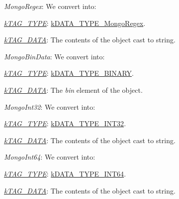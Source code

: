 \begin{DoxyItemize}
\begin{DoxyItemize}
\begin{DoxyItemize}
\end{DoxyItemize}
\end{DoxyItemize}
\item {\itshape Mongo\-Regex\/}\-: We convert into\-: 
\begin{DoxyItemize}
\item {\itshape \hyperlink{}{k\-T\-A\-G\-\_\-\-T\-Y\-P\-E}\/}\-: \hyperlink{}{k\-D\-A\-T\-A\-\_\-\-T\-Y\-P\-E\-\_\-\-Mongo\-Regex}. 
\item {\itshape \hyperlink{}{k\-T\-A\-G\-\_\-\-D\-A\-T\-A}\/}\-: The contents of the object cast to string. 
\end{DoxyItemize}
\item {\itshape Mongo\-Bin\-Data\/}\-: We convert into\-: 
\begin{DoxyItemize}
\item {\itshape \hyperlink{}{k\-T\-A\-G\-\_\-\-T\-Y\-P\-E}\/}\-: \hyperlink{}{k\-D\-A\-T\-A\-\_\-\-T\-Y\-P\-E\-\_\-\-B\-I\-N\-A\-R\-Y}. 
\item {\itshape \hyperlink{}{k\-T\-A\-G\-\_\-\-D\-A\-T\-A}\/}\-: The {\itshape bin\/} element of the object. 
\end{DoxyItemize}
\item {\itshape Mongo\-Int32\/}\-: We convert into\-: 
\begin{DoxyItemize}
\item {\itshape \hyperlink{}{k\-T\-A\-G\-\_\-\-T\-Y\-P\-E}\/}\-: \hyperlink{}{k\-D\-A\-T\-A\-\_\-\-T\-Y\-P\-E\-\_\-\-I\-N\-T32}. 
\item {\itshape \hyperlink{}{k\-T\-A\-G\-\_\-\-D\-A\-T\-A}\/}\-: The contents of the object cast to string. 
\end{DoxyItemize}
\item {\itshape Mongo\-Int64\/}\-: We convert into\-: 
\begin{DoxyItemize}
\item {\itshape \hyperlink{}{k\-T\-A\-G\-\_\-\-T\-Y\-P\-E}\/}\-: \hyperlink{}{k\-D\-A\-T\-A\-\_\-\-T\-Y\-P\-E\-\_\-\-I\-N\-T64}. 
\item {\itshape \hyperlink{}{k\-T\-A\-G\-\_\-\-D\-A\-T\-A}\/}\-: The contents of the object cast to string. 
\end{DoxyItemize}
\end{DoxyItemize}


